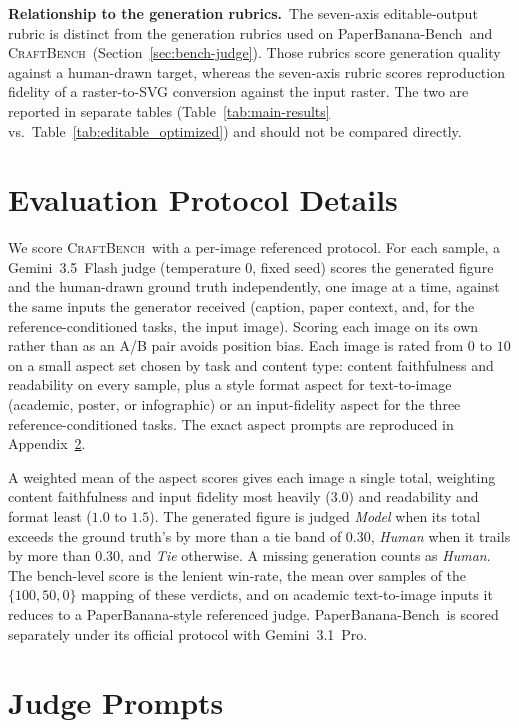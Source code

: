 \documentclass{llmxive}
\providecommand{\CrafterBench}{\textsc{CraftBench}\xspace}
\providecommand{\PaperBananaBench}{PaperBanana-Bench\xspace}
\begin{document}
\noindent\textbf{Relationship to the generation rubrics.}\
The seven-axis editable-output rubric is distinct from the generation rubrics used on \PaperBananaBench\ and \CrafterBench\ (Section~\ref{sec:bench-judge}). Those rubrics score generation quality against a human-drawn target, whereas the seven-axis rubric scores reproduction fidelity of a raster-to-SVG conversion against the input raster. The two are reported in separate tables (Table~\ref{tab:main-results} vs.\ Table~\ref{tab:editable_optimized}) and should not be compared directly.

\section{Evaluation Protocol Details}
\label{app:eval-protocol}

We score \CrafterBench\ with a per-image referenced protocol. For each sample, a Gemini~3.5~Flash judge (temperature $0$, fixed seed) scores the generated figure and the human-drawn ground truth independently, one image at a time, against the same inputs the generator received (caption, paper context, and, for the reference-conditioned tasks, the input image). Scoring each image on its own rather than as an A/B pair avoids position bias. Each image is rated from $0$ to $10$ on a small aspect set chosen by task and content type: content faithfulness and readability on every sample, plus a style format aspect for text-to-image (academic, poster, or infographic) or an input-fidelity aspect for the three reference-conditioned tasks. The exact aspect prompts are reproduced in Appendix~\ref{app:judge-prompts}.

A weighted mean of the aspect scores gives each image a single total, weighting content faithfulness and input fidelity most heavily ($3.0$) and readability and format least ($1.0$ to $1.5$). The generated figure is judged \textit{Model} when its total exceeds the ground truth's by more than a tie band of $0.30$, \textit{Human} when it trails by more than $0.30$, and \textit{Tie} otherwise. A missing generation counts as \textit{Human}. The bench-level score is the lenient win-rate, the mean over samples of the $\{100, 50, 0\}$ mapping of these verdicts, and on academic text-to-image inputs it reduces to a PaperBanana-style referenced judge. \PaperBananaBench\ is scored separately under its official protocol with Gemini~3.1~Pro.

\section{Judge Prompts}
\label{app:judge-prompts}
\end{document}
